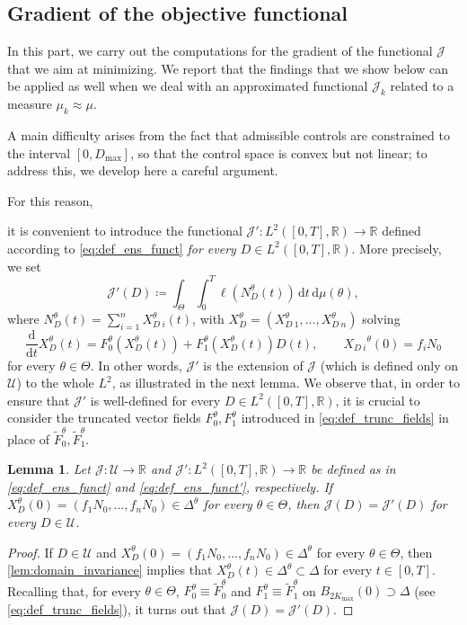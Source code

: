\documentclass[a4paper,12pt, reqno]{amsart}
\theoremstyle{plain}
\newtheorem{lemma}[theorem]{Lemma}
\theoremstyle{definition}
\theoremstyle{remark}
\numberwithin{equation}{section}
\newcommand{\J}{\mathcal{J}}
\newcommand{\R}{\mathbb{R}}
\newcommand{\U}{\mathcal{U}}
\newcommand{\de}{\,\mathrm{d}}
\begin{document}
\subsection{Gradient of the objective functional}
In this part, we carry out the computations for the gradient of the functional $\J$ that we aim at minimizing. We report that the findings that we show below can be applied as well when we deal with an approximated functional $\J_{k}$ related to a measure $\mu_{k} \approx \mu$. 
{A main difficulty arises from the fact that admissible controls are constrained to the interval $[0,D_{\max}]$, so that the control space is convex but not linear; to address this, we develop here a careful argument.

For this reason,} it is convenient to introduce the functional $\J'\colon L^2([0,T], \R)\to \R$ defined according to \cref{eq:def_ens_funct} \emph{for every ${D} \in L^2([0,T], \R)$}. 
More precisely, we set
\begin{equation} \label{eq:def_ens_funct'}
    \J'({D})\coloneqq \int_\Theta  \int_0^T \ell\left({N_D^\theta(t)}\right)  
    \de {t} \de\mu(\theta),
\end{equation}
where {$N_D^\theta(t)=\sum_{i=1}^nX_{D\ i}^\theta(t)$, with $X_D^\theta = \left( X_{D\ 1}^\theta, \ldots, X_{D\ n}^\theta \right)$} solving
\begin{equation} \label{eq:cau_prob_trunc}
    \frac{\mathrm{d}}{\mathrm{d}{t}} {X_D^\theta}({t})
    =  F_0^\theta\left({X_D^\theta} ({t}) \right)
        +
         F_1^\theta\left({X_D^\theta} ({t}) \right) {D}({t}), \qquad     
         {X_{D\ i}}^\theta(0)  =
    {f_i N_0}
\end{equation}
for every $\theta\in\Theta$.
In other words, $\J'$ is the extension of $\J$ (which is defined only on $\U$) to the whole $L^2$, as illustrated in the next lemma. 
We observe that, in order to ensure that $\J'$ is well-defined for every ${D}\in L^2([0,T], \R)$, it is crucial to consider the truncated vector fields $F_0^\theta, F_1^\theta$ introduced in \cref{eq:def_trunc_fields} in place of $\tilde F_0^\theta, \tilde F_1^\theta$. 

\begin{lemma} \label{lem:extension}
    Let $\J\colon \U\to\R$ and $\J'\colon L^2([0,T],\R)\to \R$ be defined as in \cref{eq:def_ens_funct} and \cref{eq:def_ens_funct'}, respectively.
    If ${X_D^\theta}(0) = \left( {f_1N_0,\ldots, f_nN_0} \right)\in \Delta^{\theta}$ for every $\theta \in \Theta$, then $\J({D})=\J'({D})$ for every ${D} \in\U$.
\end{lemma}
\begin{proof}
    If ${D}\in\U$ and ${X_D^\theta}(0) = \left( {f_1N_0,\ldots, f_nN_0} \right)\in \Delta^{\theta}$ for every $\theta \in \Theta$, then \cref{lem:domain_invariance} implies that ${X_D^\theta(t)} \in \Delta^{\theta} {\subset \Delta}$ for every ${t}\in[0,T]$.
    Recalling that, for every $\theta\in\Theta$, $F_0^\theta \equiv \tilde F_0^\theta$ and $F_1^\theta \equiv \tilde F_1^\theta$ on $B_{2{K_{\max}}}(0)\supset \Delta$ (see \cref{eq:def_trunc_fields}), it turns out that $\J({D})=\J'({D})$.
\end{proof}
\end{document}
